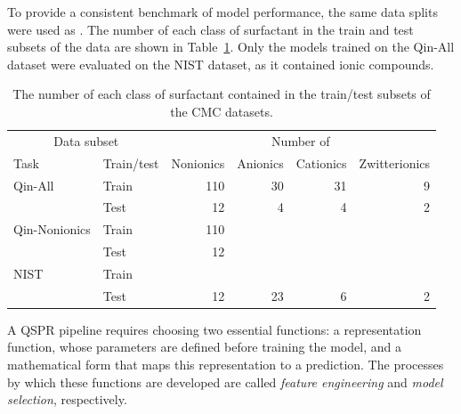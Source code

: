 To provide a consistent benchmark of model performance, the same data splits were used as \citet{qinPredictingCriticalMicelle2021}.
The number of each class of surfactant in the train and test subsets of the data are shown in Table~\ref{tab:data-split}. Only the models trained on the Qin-All dataset were evaluated on the NIST dataset, as it contained ionic compounds.

\begin{table}
    \centering
    \caption{The number of each class of surfactant contained in the train/test subsets of the CMC datasets.}
    \label{tab:data-split}
    \begin{tabular}{@{}llrrrr@{}} \toprule \multicolumn{2}{c}{Data subset} & \multicolumn{4}{c}{Number of}                                                    \\\cmidrule(r){1-2}\cmidrule(l){3-6}
               Task                                                    & Train/test                    & Nonionics & Anionics & Cationics & Zwitterionics \\\midrule
               Qin-All                                                 & Train                         & 110       & 30       & 31        & 9             \\
                                                                       & Test                          & 12        & 4        & 4         & 2             \\
               Qin-Nonionics                                           & Train                         & 110       &          &           &               \\
                                                                       & Test                          & 12        &          &           &               \\
               NIST                                                    & Train                         &           &          &           &               \\
                                                                       & Test                          & 12        & 23       & 6         & 2             \\\bottomrule
    \end{tabular}
\end{table}

A QSPR pipeline requires choosing two essential functions: a representation function, whose parameters are defined before training the model, and a mathematical form that maps this representation to a prediction. The processes
by which these functions are developed are called \emph{feature engineering} and \emph{model selection}, respectively.

